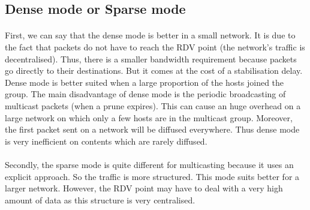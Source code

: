 \documentclass[a4paper]{article}
\begin{document}
  \subsection{Dense mode or Sparse mode}

    \paragraph{}First, we can say that the dense mode is better in a small
network. It is due to the fact that packets do not have to reach the RDV
point (the network's traffic is decentralised). Thus, there is a smaller
bandwidth requirement because packets go directly to their destinations.
But it comes at the cost of a stabilisation delay.
Dense mode is better suited when a large proportion of the hosts joined the
group.
\newline The main disadvantage of dense mode is the periodic broadcasting of
multicast packets (when a prune expires). This can cause an huge
overhead on a large network on which only a few hosts are in the multicast
group.
\newline Moreover, the first packet sent on a network will be diffused
everywhere. Thus dense mode is very inefficient on contents which are rarely
diffused.

    \paragraph{}Secondly, the sparse mode is quite different for multicasting
because it uses an explicit approach. So the traffic is more structured.
This mode suits better for a larger network.
\newline However, the RDV point may have to deal with a very high amount of data
as this structure is very centralised.
\end{document}
